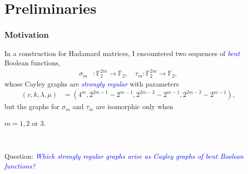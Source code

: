 \documentclass[pdf,sprung,slideColor,nocolorBG]{beamer}
\newenvironment{colortheme}[1]{
\def\ProvidesPackageRCS $##1${\relax}
\renewcommand{\ProcessOptions}{\relax}
\makeatletter

\makeatother
}{}
\newcommand{\mb}[1]{\mathbb{#1}}
\newcommand{\Emph}[1]{\emph{\textcolor{blue}{#1}}}
\newcommand{\To}{\rightarrow}
\newcommand{\F}{\mb{F}}
\begin{document}
\section{Preliminaries}

\begin{colortheme}{jubata}

\begin{frame}
\frametitle{Motivation}

In a construction for Hada\-mard matrices, I encountered
two sequences of \Emph{bent} Boolean functions,
\begin{align*}
\sigma_m &: \F_2^{2m} \To \F_2, \quad \tau_m : \F_2^{2m} \To \F_2,
\end{align*}
whose Cayley graphs are \Emph{strongly regular} with parameters
\begin{align*}
(v,k,\lambda,\mu) &= (4^m, 2^{2 m - 1} - 2^{m-1}, 2^{2 m - 2} - 2^{m-1}, 2^{2 m - 2} - 2^{m-1}),
\end{align*}
but the graphs for $\sigma_m$ and $\tau_m$ are isomorphic only when

$m=1,2$ or $3.$

~

Question: \Emph{Which strongly regular graphs arise as Cayley graphs of bent Boolean functions?}
\end{frame}
\end{colortheme}
\end{document}
